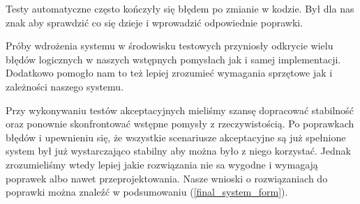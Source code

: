 \documentclass[../analiza-rozwiazania.tex]{subfiles}
\begin{document}
Testy automatyczne często kończyły się błędem po zmianie w kodzie.
Był dla nas znak aby sprawdzić co się dzieje i wprowadzić odpowiednie poprawki.

Próby wdrożenia systemu w środowisku testowych przyniosły odkrycie wielu błędów logicznych w naszych wstępnych pomysłach jak i samej implementacji.
Dodatkowo pomogło nam to też lepiej zrozumieć wymagania sprzętowe jak i zależności naszego systemu.

Przy wykonywaniu testów akceptacyjnych mieliśmy szansę dopracować stabilność oraz ponownie skonfrontować wstępne pomysły z rzeczywistością.
Po poprawkach błędów i upewnieniu się, że wszystkie scenariusze akceptacyjne są już spełnione system był już wystarczająco stabilny aby można było z niego korzystać.
Jednak zrozumieliśmy wtedy lepiej jakie rozwiązania nie sa wygodne i wymagają poprawek albo nawet przeprojektowania.
Nasze wnioski o rozwiązaniach do poprawki można znaleźć w podsumowaniu (\ref{final_system_form}).
\end{document}
